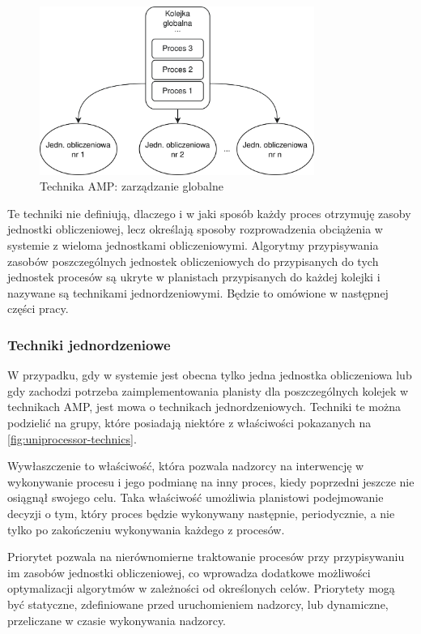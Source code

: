 \documentclass[../../main]{subfiles}
\begin{document}
\begin{figure}[ht]
    \centering
    \includegraphics[width=0.80\textwidth]{Images/dynamic-scheduling.png}
    \caption{Technika AMP: zarządzanie globalne}
    \label{fig:dynamic-scheduling}
\end{figure}

Te techniki nie definiują, dlaczego i w jaki sposób każdy proces otrzymuję zasoby jednostki obliczeniowej, lecz określają sposoby rozprowadzenia obciążenia w systemie z wieloma jednostkami obliczeniowymi. Algorytmy przypisywania zasobów poszczególnych jednostek obliczeniowych do przypisanych do tych jednostek procesów są ukryte w planistach przypisanych do każdej kolejki i nazywane są technikami jednordzeniowymi. Będzie to omówione w następnej części pracy. %

\subsubsection{Techniki jednordzeniowe}

W przypadku, gdy w systemie jest obecna tylko jedna jednostka obliczeniowa lub gdy zachodzi potrzeba zaimplementowania planisty dla poszczególnych kolejek w technikach AMP, jest mowa o technikach jednordzeniowych. Techniki te można podzielić na grupy, które posiadają niektóre z właściwości pokazanych na \cref{fig:uniprocessor-technics}.

Wywłaszczenie to właściwość, która pozwala nadzorcy na interwencję w wykonywanie procesu i jego podmianę na inny proces, kiedy poprzedni jeszcze nie osiągnął swojego celu. Taka właściwość umożliwia planistowi podejmowanie decyzji o tym, który proces będzie wykonywany następnie, periodycznie, a nie tylko po zakończeniu wykonywania każdego z procesów.

Priorytet pozwala na nierównomierne traktowanie procesów przy przypisywaniu im zasobów jednostki obliczeniowej, co wprowadza dodatkowe możliwości optymalizacji algorytmów w zależności od określonych celów. Priorytety mogą być statyczne, zdefiniowane przed uruchomieniem nadzorcy, lub dynamiczne, przeliczane w czasie wykonywania nadzorcy.
\end{document}
